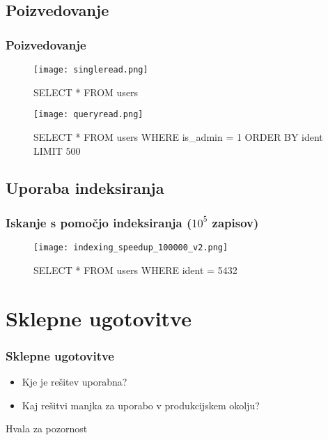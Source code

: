 \documentclass{beamer}
\begin{document}
    \subsection{Poizvedovanje}
    \begin{frame}
        \frametitle{Poizvedovanje}
        \begin{figure}
            \begin{minipage}[t]{0.45\textwidth}
                \centering
                \texttt{[image: singleread.png]}
                \caption*{
                SELECT * FROM users}
            \end{minipage}
            \hfill
            \begin{minipage}[t]{0.45\textwidth}
                \centering
                \texttt{[image: queryread.png]}
                \caption*{
                    SELECT * FROM users\newline
                    WHERE is\_admin = 1\newline
                    ORDER BY ident\newline
                    LIMIT 500}
                
                
            \end{minipage}
        \end{figure}
    \end{frame}

    \subsection{Uporaba indeksiranja}
    \begin{frame}
        \frametitle{Iskanje s pomočjo indeksiranja ($10^5$ zapisov)}
        \begin{figure}
        \centering
        \texttt{[image: indexing\_speedup\_100000\_v2.png]}
        \caption*{
SELECT *  FROM users WHERE ident = 5432}
        \end{figure}
    \end{frame}

\section{Sklepne ugotovitve}
\begin{frame}
\frametitle{Sklepne ugotovitve}
    \begin{itemize}
        \item Kje je rešitev uporabna?
        \item Kaj rešitvi manjka za uporabo v produkcijskem okolju?
    \end{itemize}
\end{frame}

\begin{frame}
\Huge{\centerline{Hvala za pozornost}}
\end{frame}

\end{document}
